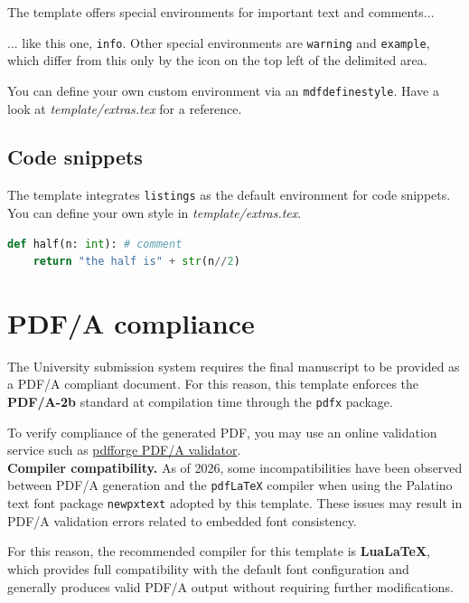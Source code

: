The template offers special environments for important text and comments...
\begin{info}
... like this one, \texttt{info}. Other special environments are \texttt{warning} and \texttt{example}, which differ from this only by the icon on the top left of the delimited area.
\end{info}
You can define your own custom environment via an \texttt{mdfdefinestyle}.
Have a look at \textit{template/extras.tex} for a reference.

\subsection{Code snippets}

The template integrates \texttt{listings} as the default environment for code snippets. You can define your own style in \textit{template/extras.tex}.

\begin{lstlisting}[language=Python]
def half(n: int): # comment
    return "the half is" + str(n//2)
\end{lstlisting}


\section{PDF/A compliance}

The University submission system requires the final manuscript to be provided as a PDF/A compliant document.
For this reason, this template enforces the \textbf{PDF/A-2b} standard at compilation time through the \verb|pdfx| package.

To verify compliance of the generated PDF, you may use an online validation service such as
\href{https://www.pdfforge.org/online/en/validate-pdfa}{pdfforge PDF/A validator}.\\

\noindent
\textbf{Compiler compatibility.}
As of 2026, some incompatibilities have been observed between PDF/A generation and the \verb|pdfLaTeX| compiler when using the Palatino text font package \verb|newpxtext| adopted by this template.
These issues may result in PDF/A validation errors related to embedded font consistency.

For this reason, the recommended compiler for this template is \textbf{LuaLaTeX}, which provides full compatibility with the default font configuration and generally produces valid PDF/A output without requiring further modifications.

